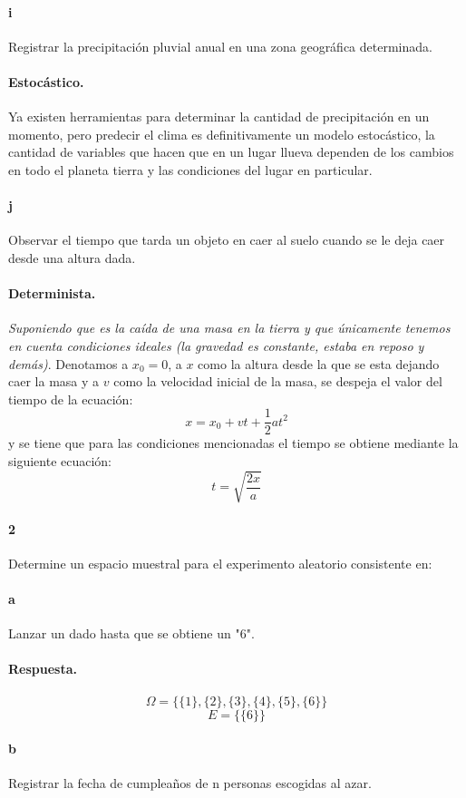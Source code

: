 \documentclass{article}
\begin{document}
\paragraph{i} Registrar la precipitación pluvial anual en una zona geográfica determinada.
\paragraph{Estocástico.} Ya existen herramientas para determinar la cantidad de precipitación en un momento, pero predecir el clima es definitivamente un modelo estocástico, la cantidad de variables que hacen que en un lugar llueva dependen de los cambios en todo el planeta tierra y las condiciones del lugar en particular.
\paragraph{j} Observar el tiempo que tarda un objeto en caer al suelo cuando se le deja caer desde una altura dada.
\paragraph{Determinista.} \textit{Suponiendo que es la caída de una masa en la tierra y que únicamente tenemos en cuenta condiciones ideales (la gravedad es constante, estaba en reposo y demás)}. Denotamos a $x_0 = 0$, a $x$ como la altura desde la que se esta dejando caer la masa y a $v$ como la velocidad inicial de la masa, se despeja el valor del tiempo de la ecuación:
$$x = x_0 + vt + \frac{1}{2}at^2$$
y se tiene que para las condiciones mencionadas el tiempo se obtiene mediante la siguiente ecuación:
$$t = \sqrt{\frac{2x}{a}}$$
\paragraph{2} Determine un espacio muestral para el experimento aleatorio consistente en:
\paragraph{a} Lanzar un dado hasta que se obtiene un "6".
\paragraph{Respuesta.}
$$\Omega = \{ \{1\}, \{2\}, \{3\}, \{4\}, \{5\}, \{6\} \}$$
$$E = \{\{6\}\}$$
\paragraph{b} Registrar la fecha de cumpleaños de n personas escogidas al azar.
\end{document}
